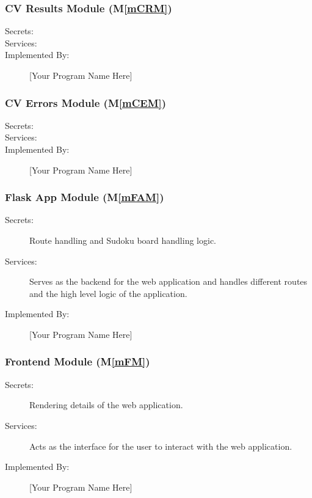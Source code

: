 \documentclass[12pt, titlepage]{article}
\newcommand{\mref}[1]{M\ref{#1}}
\begin{document}
\subsubsection{CV Results Module (\mref{mCRM})}

\begin{description}
\item[Secrets:] 
\item[Services:] 
\item[Implemented By:] [Your Program Name Here]
\end{description}

\subsubsection{CV Errors Module (\mref{mCEM})}

\begin{description}
\item[Secrets:] 
\item[Services:] 
\item[Implemented By:] [Your Program Name Here]
\end{description}

\subsubsection{Flask App Module (\mref{mFAM})}

\begin{description}
\item[Secrets:] Route handling and Sudoku board handling logic.
\item[Services:] Serves as the backend for the web application and handles different routes and the high level logic of the application.
\item[Implemented By:] [Your Program Name Here]
\end{description}

\subsubsection{Frontend Module (\mref{mFM})}

\begin{description}
\item[Secrets:] Rendering details of the web application.
\item[Services:] Acts as the interface for the user to interact with the web application.
\item[Implemented By:] [Your Program Name Here]
\end{description}
\end{document}
